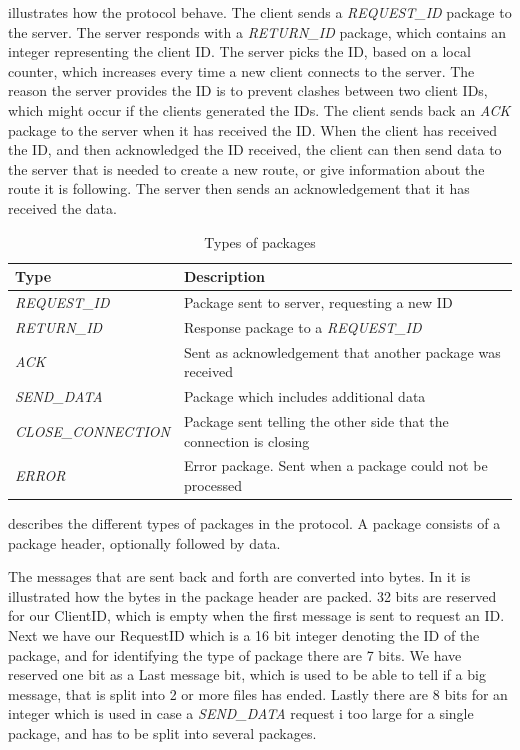  illustrates how the protocol behave.
The client sends a \textit{REQUEST\_ID} package to the server.
The server responds with a \textit{RETURN\_ID} package,
which contains an integer representing the client ID.
The server picks the ID, based on a local counter, which increases every time a new client connects to the server.
The reason the server provides the ID is to prevent clashes between two client IDs,
which might occur if the clients generated the IDs.
The client sends back an \textit{ACK} package to the server when it has received the ID.
When the client has received the ID, and then acknowledged the ID received,
the client can then send data to the server that is needed to create a new route,
or give information about the route it is following.
The server then sends an acknowledgement that it has received the data.

\begin{table}
\centering
\begin{tabular}{l|p{}}
\textbf{Type}              & \textbf{Description} \\
\hline
\textit{REQUEST\_ID}       & Package sent to server, requesting a new ID \\
\hline
\textit{RETURN\_ID}        & Response package to a \textit{REQUEST\_ID} \\
\hline
\textit{ACK}               & Sent as acknowledgement that another package was received \\
\hline
\textit{SEND\_DATA}        & Package which includes additional data \\
\hline
\textit{CLOSE\_CONNECTION} & Package sent telling the other side that the connection is closing \\
\hline
\textit{ERROR}             & Error package. Sent when a package could not be processed \\
\end{tabular}
\caption{Types of packages}
\label{tab:package_types}
\end{table}

 describes the different types of packages in the protocol.
A package consists of a package header, optionally followed by data.

The messages that are sent back and forth are converted into bytes.
In  it is illustrated how the bytes in the package header are packed.
32 bits are reserved for our ClientID, which is empty when the first message is sent to request an ID.
Next we have our RequestID which is a 16 bit integer denoting the ID of the package,
and for identifying the type of package there are 7 bits.
We have reserved one bit as a Last message bit, which is used to be able to tell if a big message,
that is split into 2 or more files has ended.
Lastly there are 8 bits for an integer which is used in case a \textit{SEND\_DATA} request i too large for a single package,
and has to be split into several packages.

